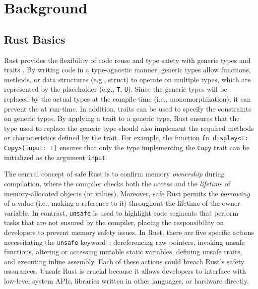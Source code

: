 \section{Background}
\label{sec:bg}

\subsection{Rust Basics}

Rust provides the flexibility of code reuse and type safety with generic types and traits \cite{GenericD71:online, traits}. By writing code in a type-agnostic manner, generic types allow functions, methods, or data structures (e.g., struct) to operate on multiple types, which are represented by the placeholder (e.g., \texttt{T}, \texttt{U}). Since the generic types will be replaced by the actual types at the compile-time (i.e., monomorphization), it can prevent the \bugs at run-time. In addition, traits can be used to specify the constraints on generic types. By applying a trait to a generic type, Rust ensures that the type used to replace the generic type should also implement the required methods or characteristics defined by the trait. For example, the function \texttt{fn display<T: Copy>(input: T)} ensures that only the type implementing the \texttt{Copy} trait can be initialized as the argument \texttt{input}.

\vspace{0.05in}
The central concept of safe Rust is to confirm memory {\it ownership} during compilation, where the compiler checks both the access and the {\it lifetime} of memory-allocated objects (or values). Moreover, safe Rust permits the {\it borrowing} of a value (i.e., making a reference to it) throughout the lifetime of the owner variable. In contrast, \texttt{unsafe} is used to highlight code segments that perform tasks that are not ensured by the compiler, placing the responsibility on developers to prevent memory safety issues. In Rust, there are five specific actions necessitating the \texttt{unsafe} keyword~\cite{unsafeRu19online}: dereferencing raw pointers, invoking unsafe functions, altering or accessing mutable static variables, defining unsafe traits, and executing inline assembly. Each of these actions could breach Rust's safety assurances. Unsafe Rust is crucial because it allows developers to interface with low-level system APIs, libraries written in other languages, or hardware directly.  


